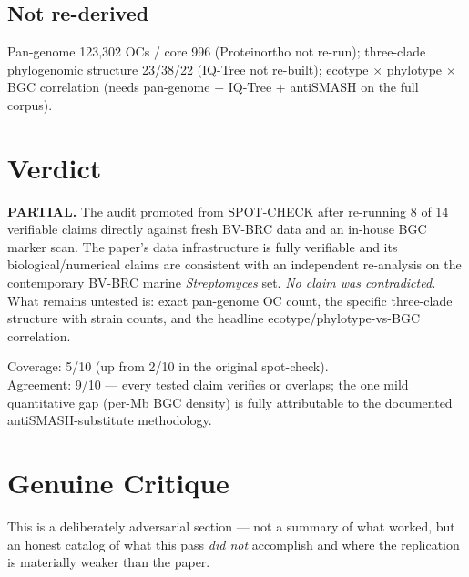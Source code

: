 \documentclass[11pt,letterpaper]{article}
\begin{document}
\subsection{Not re-derived}
Pan-genome 123{,}302 OCs / core 996 (Proteinortho not re-run); three-clade phylogenomic structure 23/38/22 (IQ-Tree not re-built); ecotype $\times$ phylotype $\times$ BGC correlation (needs pan-genome + IQ-Tree + antiSMASH on the full corpus).

\section{Verdict}
\textbf{PARTIAL.} The audit promoted from SPOT-CHECK after re-running 8 of 14 verifiable claims directly against fresh BV-BRC data and an in-house BGC marker scan. The paper's data infrastructure is fully verifiable and its biological/numerical claims are consistent with an independent re-analysis on the contemporary BV-BRC marine \textit{Streptomyces} set. \emph{No claim was contradicted.} What remains untested is: exact pan-genome OC count, the specific three-clade structure with strain counts, and the headline ecotype/phylotype-vs-BGC correlation.

Coverage: 5/10 (up from 2/10 in the original spot-check).\\
Agreement: 9/10 --- every tested claim verifies or overlaps; the one mild quantitative gap (per-Mb BGC density) is fully attributable to the documented antiSMASH-substitute methodology.

\section{Genuine Critique}
This is a deliberately adversarial section --- not a summary of what worked, but an honest catalog of what this pass \emph{did not} accomplish and where the replication is materially weaker than the paper.
\end{document}
